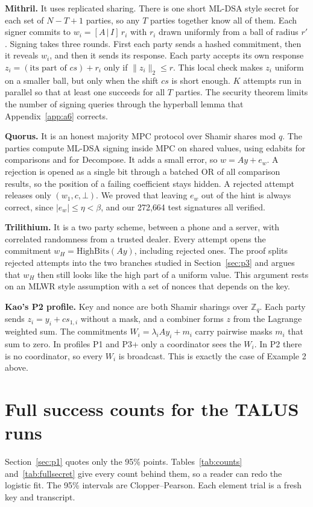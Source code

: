 \documentclass[10pt,conference,a4paper]{IEEEtran}
\newcommand{\HB}{\mathrm{HighBits}}
\begin{document}
\textbf{Mithril.} It uses replicated sharing. There is one short ML-DSA style secret for each set of $N-T+1$ parties, so any
$T$ parties together know all of them. Each signer commits to $w_i=[A\,|\,I]\,r_i$ with $r_i$ drawn uniformly from a ball
of radius $r'$. Signing takes three rounds. First each party sends a hashed commitment, then it reveals $w_i$, and then it sends its
response. Each party accepts
its own response $z_i=(\text{its part of } c s)+r_i$ only if $\lVert z_i\rVert_2\le r$. This local check makes $z_i$
uniform on a smaller ball, but only when the shift $c s$ is short enough. $K$ attempts run in parallel so that at least one
succeeds for all $T$ parties. The security theorem limits the number of signing queries through the hyperball lemma that
Appendix~\ref{app:a6} corrects.

\textbf{Quorus.} It is an honest majority MPC protocol over Shamir shares mod $q$. The parties compute ML-DSA signing inside
MPC on shared values, using edabits for comparisons and for Decompose. It adds a small error, so $w=Ay+e_w$. A rejection is
opened as a single bit through a batched OR of all comparison results, so the position of a failing coefficient stays
hidden. A rejected attempt releases only $(w_1,c,\bot)$. We proved that leaving $e_w$ out of the hint is always correct,
since $|e_w|\le\eta<\beta$, and our 272{,}664 test signatures all verified.

\textbf{Trilithium.} It is a two party scheme, between a phone and a server, with correlated randomness from a trusted
dealer. Every attempt opens the commitment $w_H=\HB(Ay)$, including rejected ones. The proof splits rejected attempts into
the two branches studied in Section~\ref{sec:p3} and argues that $w_H$ then still looks like the high part of a uniform
value. This argument rests on an MLWR style assumption with a set of nonces that depends on the key.

\textbf{Kao's P2 profile.} Key and nonce are both Shamir sharings over $\mathbb{Z}_q$. Each party sends
$z_i=y_i+c s_{1,i}$ without a mask, and a combiner forms $z$ from the Lagrange weighted sum. The commitments
$W_i=\lambda_i A y_i+m_i$ carry pairwise masks $m_i$ that sum to zero. In profiles P1 and P3+ only a coordinator sees the
$W_i$. In P2 there is no coordinator, so every $W_i$ is broadcast. This is exactly the case of Example 2 above.

\section{Full success counts for the TALUS runs}\label{app:counts}
Section~\ref{sec:p1} quotes only the 95\% points. Tables~\ref{tab:counts} and~\ref{tab:fullsecret} give every count behind
them, so a reader can redo the logistic fit. The 95\% intervals are Clopper--Pearson. Each element trial is a fresh key and
transcript.
\end{document}

